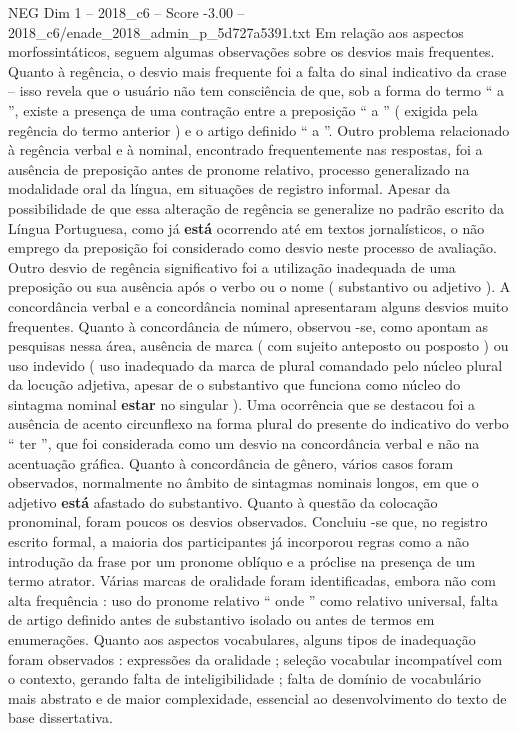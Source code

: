 \begin{textsample}{NEG Dim 1 – 2018\_c6 – Score -3.00 – 2018\_c6/enade\_2018\_admin\_p\_5d727a5391.txt}
Em relação aos aspectos morfossintáticos, seguem algumas observações sobre os desvios mais frequentes.
Quanto à regência, o desvio mais frequente foi a falta do sinal indicativo da crase – isso revela que o usuário não tem consciência de que, sob a forma do termo “ a ”, existe a presença de uma contração entre a preposição “ a ” ( exigida pela regência do termo anterior ) e o artigo definido “ a ”.
Outro problema relacionado à regência verbal e à nominal, encontrado frequentemente nas respostas, foi a ausência de preposição antes de pronome relativo, processo generalizado na modalidade oral da língua, em situações de registro informal.
Apesar da possibilidade de que essa alteração de regência se generalize no padrão escrito da Língua Portuguesa, como já \textbf{está} ocorrendo até em textos jornalísticos, o não emprego da preposição foi considerado como desvio neste processo de avaliação.
Outro desvio de regência significativo foi a utilização inadequada de uma preposição ou sua ausência após o verbo ou o nome ( substantivo ou adjetivo ).
A concordância verbal e a concordância nominal apresentaram alguns desvios muito frequentes.
Quanto à concordância de número, observou -se, como apontam as pesquisas nessa área, ausência de marca ( com sujeito anteposto ou posposto ) ou uso indevido ( uso inadequado da marca de plural comandado pelo núcleo plural da locução adjetiva, apesar de o substantivo que funciona como núcleo do sintagma nominal \textbf{estar} no singular ).
Uma ocorrência que se destacou foi a ausência de acento circunflexo na forma plural do presente do indicativo do verbo “ ter ”, que foi considerada como um desvio na concordância verbal e não na acentuação gráfica.
Quanto à concordância de gênero, vários casos foram observados, normalmente no âmbito de sintagmas nominais longos, em que o adjetivo \textbf{está} afastado do substantivo.
Quanto à questão da colocação pronominal, foram poucos os desvios observados.
Concluiu -se que, no registro escrito formal, a maioria dos participantes já incorporou regras como a não introdução da frase por um pronome oblíquo e a próclise na presença de um termo atrator.
Várias marcas de oralidade foram identificadas, embora não com alta frequência : uso do pronome relativo “ onde ” como relativo universal, falta de artigo definido antes de substantivo isolado ou antes de termos em enumerações.
Quanto aos aspectos vocabulares, alguns tipos de inadequação foram observados : expressões da oralidade ; seleção vocabular incompatível com o contexto, gerando falta de inteligibilidade ; falta de domínio de vocabulário mais abstrato e de maior complexidade, essencial ao desenvolvimento do texto de base dissertativa.

\end{textsample}
